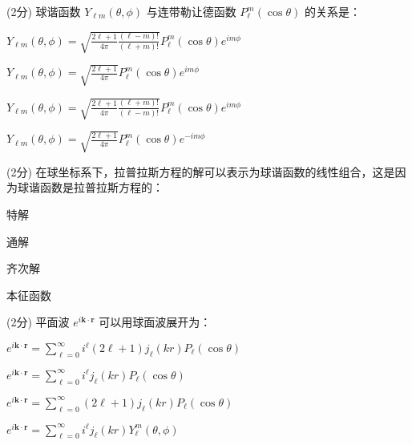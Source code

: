 \documentclass{njustexam}
\begin{document}
                \begin{problem}{(2分)}
                球谐函数 $Y_{\ell m}(\theta, \phi)$ 与连带勒让德函数 $P_{\ell}^m(\cos \theta)$ 的关系是：
                \begin{abcd}
                \item $Y_{\ell m}(\theta, \phi) = \sqrt{\frac{2\ell+1}{4\pi} \frac{(\ell-m)!}{(\ell+m)!}} P_{\ell}^m(\cos \theta) e^{im\phi}$
                \item $Y_{\ell m}(\theta, \phi) = \sqrt{\frac{2\ell+1}{4\pi}} P_{\ell}^m(\cos \theta) e^{im\phi}$
                \item $Y_{\ell m}(\theta, \phi) = \sqrt{\frac{2\ell+1}{4\pi} \frac{(\ell+m)!}{(\ell-m)!}} P_{\ell}^m(\cos \theta) e^{im\phi}$
                \item $Y_{\ell m}(\theta, \phi) = \sqrt{\frac{2\ell+1}{4\pi}} P_{\ell}^m(\cos \theta) e^{-im\phi}$
                \end{abcd}
                \end{problem}
                
                \begin{problem}{(2分)}
                在球坐标系下，拉普拉斯方程的解可以表示为球谐函数的线性组合，这是因为球谐函数是拉普拉斯方程的：
                \begin{abcd}
                \item 特解
                \item 通解
                \item 齐次解
                \item 本征函数
                \end{abcd}
                \end{problem}

                \begin{problem}{(2分)}
                    平面波 $e^{i\mathbf{k} \cdot \mathbf{r}}$ 可以用球面波展开为：
                    \begin{abcd}
                    \item $e^{i\mathbf{k} \cdot \mathbf{r}} = \sum_{\ell=0}^{\infty} i^{\ell} (2\ell+1) j_{\ell}(kr) P_{\ell}(\cos \theta)$
                    \item $e^{i\mathbf{k} \cdot \mathbf{r}} = \sum_{\ell=0}^{\infty} i^{\ell} j_{\ell}(kr) P_{\ell}(\cos \theta)$
                    \item $e^{i\mathbf{k} \cdot \mathbf{r}} = \sum_{\ell=0}^{\infty} (2\ell+1) j_{\ell}(kr) P_{\ell}(\cos \theta)$
                    \item $e^{i\mathbf{k} \cdot \mathbf{r}} = \sum_{\ell=0}^{\infty} i^{\ell} j_{\ell}(kr) Y_{\ell}^{m}(\theta, \phi)$
                    \end{abcd}
                    \end{problem}
                    
\end{document}
